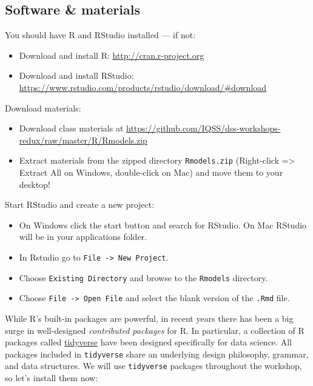 \documentclass[]{book}
\providecommand{\tightlist}{%
  \setlength{\itemsep}{0pt}\setlength{\parskip}{0pt}}
\begin{document}
\subsection{Software \& materials}\label{software-materials-1}

You should have R and RStudio installed --- if not:

\begin{itemize}
\tightlist
\item
  Download and install R: \url{http://cran.r-project.org}
\item
  Download and install RStudio:
  \url{https://www.rstudio.com/products/rstudio/download/\#download}
\end{itemize}

Download materials:

\begin{itemize}
\tightlist
\item
  Download class materials at
  \url{https://github.com/IQSS/dss-workshops-redux/raw/master/R/Rmodels.zip}
\item
  Extract materials from the zipped directory \texttt{Rmodels.zip}
  (Right-click =\textgreater{} Extract All on Windows, double-click on
  Mac) and move them to your desktop!
\end{itemize}

Start RStudio and create a new project:

\begin{itemize}
\tightlist
\item
  On Windows click the start button and search for RStudio. On Mac
  RStudio will be in your applications folder.
\item
  In Rstudio go to \texttt{File\ -\textgreater{}\ New\ Project}.
\item
  Choose \texttt{Existing\ Directory} and browse to the \texttt{Rmodels}
  directory.
\item
  Choose \texttt{File\ -\textgreater{}\ Open\ File} and select the blank
  version of the \texttt{.Rmd} file.
\end{itemize}

While R's built-in packages are powerful, in recent years there has been
a big surge in well-designed \emph{contributed packages} for R. In
particular, a collection of R packages called
\href{https://www.tidyverse.org/}{tidyverse} have been designed
specifically for data science. All packages included in
\texttt{tidyverse} share an underlying design philosophy, grammar, and
data structures. We will use \texttt{tidyverse} packages throughout the
workshop, so let's install them now:
\end{document}
